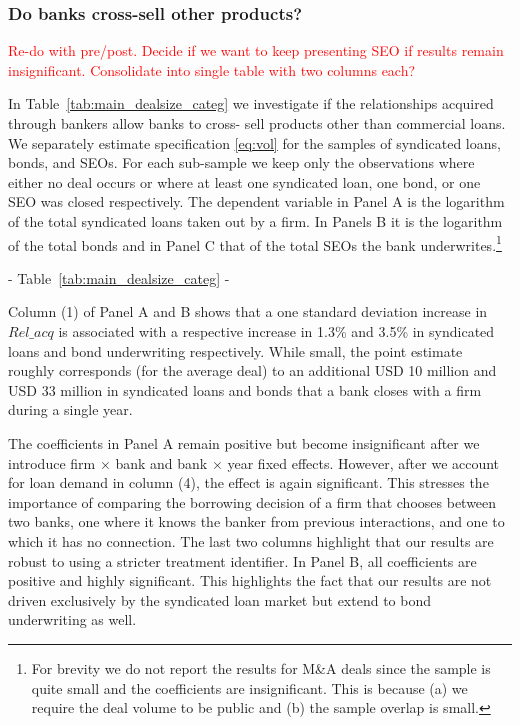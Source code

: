 \subsubsection{Do banks cross-sell other products?}

\textcolor{red}{Re-do with pre/post. Decide if we want to keep presenting SEO if results remain insignificant. Consolidate into single table with two columns each?}

In Table~\ref{tab:main_dealsize_categ} we investigate if the relationships acquired through bankers allow banks to cross- sell products other than commercial loans. We separately estimate specification \ref{eq:vol} for the samples of syndicated loans, bonds, and SEOs. For each sub-sample we keep only the observations where either no deal occurs or where at least one syndicated loan, one bond, or one SEO was closed respectively. The dependent variable in Panel A is the logarithm of the total syndicated loans taken out by a firm. In Panels B it is the logarithm of the total bonds and in Panel C that of the total SEOs the bank underwrites.\footnote{For brevity we do not report the results for M\&A deals since the sample is quite small and the coefficients are insignificant. This is because (a) we require  the deal volume to be public and (b) the sample overlap is small.}  

\begin{center} - Table~\ref{tab:main_dealsize_categ} - \end{center}

Column (1) of Panel A and B shows that a one standard deviation increase in $Rel\_acq$ is associated with a respective increase in 1.3\% and 3.5\% in syndicated loans and bond underwriting respectively. While small, the point estimate roughly corresponds (for the average deal) to an additional USD 10 million and USD 33 million in syndicated loans and bonds that a bank closes with a firm during a single year. 

The coefficients in Panel A remain positive but become insignificant after we introduce firm $\times$ bank and bank $\times$ year fixed effects. However, after we account for loan demand in column (4), the effect is again significant. This stresses the importance of comparing the borrowing decision of a firm that chooses between two banks, one where it knows the banker from previous interactions, and one to which it has no connection. The last two columns highlight that our results are robust to using a stricter treatment identifier. In Panel B, all coefficients are positive and highly significant. This highlights the fact that our results are not driven exclusively by the syndicated loan market but extend to bond underwriting as well. 

